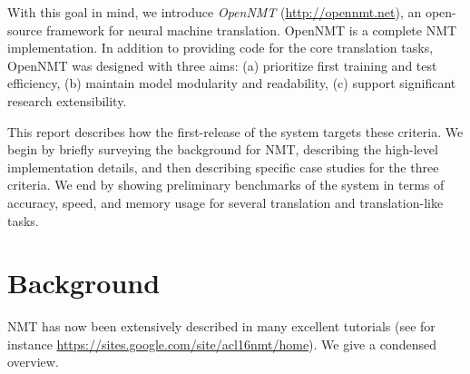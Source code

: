 \documentclass[11pt]{article}
\begin{document}
With this goal in mind, we introduce \textit{OpenNMT} (\url{http://opennmt.net}), an open-source framework
for neural machine translation. OpenNMT is a complete NMT
implementation. In addition to providing code for the core translation
tasks, OpenNMT was designed with three aims:
(a) prioritize first training and test efficiency, (b) maintain model modularity and readability, (c) support significant research extensibility.

This report describes how the first-release of the
system targets these criteria. We begin by briefly surveying the
background for NMT, describing the high-level implementation details,
and then describing specific case studies for the three criteria.  We
end by showing preliminary benchmarks of the system in terms of
accuracy, speed, and memory usage for several translation and
translation-like tasks.








\section{Background}

NMT has now been extensively described in many
excellent tutorials (see for instance
\url{https://sites.google.com/site/acl16nmt/home}). We give
a condensed overview. 
\end{document}
